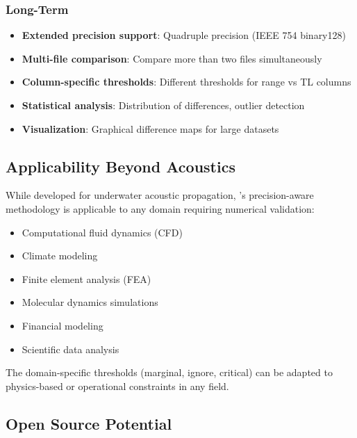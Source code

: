 \subsubsection{Long-Term}

\begin{itemize}
    \item \textbf{Extended precision support}: Quadruple precision (IEEE 754 binary128)

    \item \textbf{Multi-file comparison}: Compare more than two files simultaneously

    \item \textbf{Column-specific thresholds}: Different thresholds for range vs TL columns

    \item \textbf{Statistical analysis}: Distribution of differences, outlier detection

    \item \textbf{Visualization}: Graphical difference maps for large datasets
\end{itemize}

\subsection{Applicability Beyond Acoustics}

While developed for underwater acoustic propagation, \ubdiff{}'s precision-aware methodology is applicable to any domain requiring numerical validation:

\begin{itemize}
    \item Computational fluid dynamics (CFD)
    \item Climate modeling
    \item Finite element analysis (FEA)
    \item Molecular dynamics simulations
    \item Financial modeling
    \item Scientific data analysis
\end{itemize}

The domain-specific thresholds (marginal, ignore, critical) can be adapted to physics-based or operational constraints in any field.

\subsection{Open Source Potential}

